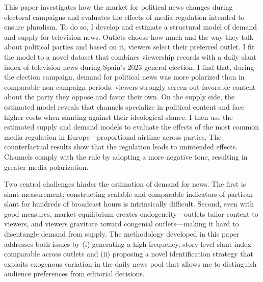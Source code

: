 \documentclass[12pt]{article}
\begin{document}
This paper investigates how the market for political news changes during electoral campaigns and evaluates the effects of media regulation intended to ensure pluralism. To do so, I develop and estimate a structural model of demand and supply for television news. Outlets choose how much and the way they talk about political parties and based on it, viewers select their preferred outlet. I fit the model to a novel dataset that combines viewership records with a daily slant index of television news during Spain's 2023 general election. I find that, during the election campaign, demand for political news was more polarized than in comparable non-campaign periods: viewers strongly screen out favorable content about the party they oppose and favor their own. On the supply side, the estimated model reveals that channels specialize in political content and face higher costs when slanting against their ideological stance. I then use the estimated supply and demand models to evaluate the effects of the most common media regulation in Europe—proportional airtime across parties. The counterfactual results show that the regulation leads to unintended effects. Channels comply with the rule by adopting a more negative tone, resulting in greater media polarization.





	
	
	Two central challenges hinder the estimation of demand for news. The first is slant measurement: constructing scalable and comparable indicators of partisan slant for hundreds of broadcast hours is intrinsically difficult. Second, even with good measures, market equilibrium creates endogeneity—outlets tailor content to viewers, and viewers gravitate toward congenial outlets—making it hard to disentangle demand from supply. The methodology developed in this paper addresses both issues by (i) generating a high-frequency, story-level slant index comparable across outlets and (ii) proposing a novel identification strategy that exploits exogenous variation in the daily news pool that allows me to distinguish audience preferences from editorial decisions.
	
\end{document}
